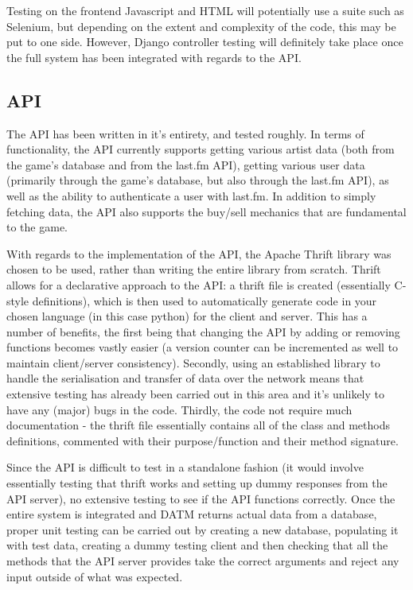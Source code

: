 \documentclass[a4paper,10pt,twoside]{article}
\begin{document}
Testing on the frontend Javascript and HTML will potentially use a suite such as Selenium, but depending on the extent and complexity of the code, this may be put to one side. However, Django controller testing will definitely take place once the full system has been integrated with regards to the API.

\subsection{API}

The API has been written in it's entirety, and tested roughly. In terms of functionality, the API currently supports getting various artist data (both from the game's database and from the last.fm API), getting various user data (primarily through the game's database, but also through the last.fm API), as well as the ability to authenticate a user with last.fm. In addition to simply fetching data, the API also supports the buy/sell mechanics that are fundamental to the game.

With regards to the implementation of the API, the Apache Thrift library was chosen to be used, rather than writing the entire library from scratch. Thrift allows for a declarative approach to the API: a thrift file is created (essentially C-style definitions), which is then used to automatically generate code in your chosen language (in this case python) for the client and server. This has a number of benefits, the first being that changing the API by adding or removing functions becomes vastly easier (a version counter can be incremented as well to maintain client/server consistency). Secondly, using an established library to handle the serialisation and transfer of data over the network means that extensive testing has already been carried out in this area and it's unlikely to have any (major) bugs in the code. Thirdly, the code not require much documentation - the thrift file essentially contains all of the class and methods definitions, commented with their purpose/function and their method signature.

Since the API is difficult to test in a standalone fashion (it would involve essentially testing that thrift works and setting up dummy responses from the API server), no extensive testing to see if the API functions correctly. Once the entire system is integrated and DATM returns actual data from a database, proper unit testing can be carried out by creating a new database, populating it with test data, creating a dummy testing client and then checking that all the methods that the API server provides take the correct arguments and reject any input outside of what was expected.
\end{document}
